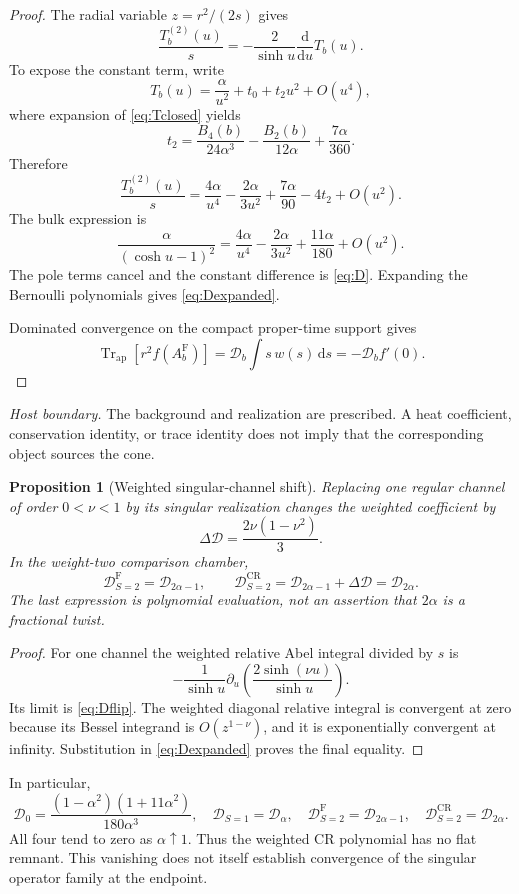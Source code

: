 \documentclass[11pt,a4paper]{article}
\newcommand{\dd}{\mathrm d}
\newcommand{\Fr}{\mathrm F}
\newcommand{\CR}{\mathrm{CR}}
\newcommand{\ApTr}{\operatorname{Tr}_{\mathrm{ap}}}
\newcommand{\Dcal}{\mathcal D}
\theoremstyle{plain}
\newtheorem{proposition}[theorem]{Proposition}
\theoremstyle{definition}
\theoremstyle{remark}
\numberwithin{equation}{section}
\newcommand{\nonsource}{%
  \par\smallskip\noindent
  \emph{Host boundary.}
  The background and realization are prescribed.
  A heat coefficient, conservation identity, or trace identity does
  not imply that the corresponding object sources the cone.%
}
\begin{document}
\begin{proof}
The radial variable \(z=r^2/(2s)\) gives
\[
 \frac{T_b^{(2)}(u)}{s}
 =-\frac{2}{\sinh u}\frac{\dd}{\dd u}T_b(u).
\]
To expose the constant term, write
\[
 T_b(u)=\frac{\alpha}{u^2}+t_0+t_2u^2+O(u^4),
\]
where expansion of \eqref{eq:Tclosed} yields
\[
 t_2=\frac{B_4(b)}{24\alpha^3}
     -\frac{B_2(b)}{12\alpha}
     +\frac{7\alpha}{360}.
\]
Therefore
\[
 \frac{T_b^{(2)}(u)}s
 =\frac{4\alpha}{u^4}-\frac{2\alpha}{3u^2}
   +\frac{7\alpha}{90}-4t_2+O(u^2).
\]
The bulk expression is
\[
 \frac{\alpha}{(\cosh u-1)^2}
 =\frac{4\alpha}{u^4}-\frac{2\alpha}{3u^2}
   +\frac{11\alpha}{180}+O(u^2).
\]
The pole terms cancel and the constant difference is
\eqref{eq:D}. Expanding the Bernoulli polynomials gives
\eqref{eq:Dexpanded}.

Dominated convergence on the compact proper-time support gives
\[
 \ApTr[r^2f(A_b^\Fr)]
 =\Dcal_b\int s\,w(s)\,\dd s=-\Dcal_b f'(0).
\]
\end{proof}
\nonsource

\begin{proposition}[Weighted singular-channel shift]
\label{prop:Dflip}
Replacing one regular channel of order \(0<\nu<1\) by its
singular realization changes the weighted coefficient by
\begin{equation}
 \Delta\Dcal=\frac{2\nu(1-\nu^2)}3.
 \label{eq:Dflip}
\end{equation}
In the weight-two comparison chamber,
\[
 \Dcal_{S=2}^\Fr=\Dcal_{2\alpha-1},
 \qquad
 \Dcal_{S=2}^\CR
 =\Dcal_{2\alpha-1}+\Delta\Dcal
 =\Dcal_{2\alpha}.
\]
The last expression is polynomial evaluation, not an assertion
that \(2\alpha\) is a fractional twist.
\end{proposition}

\begin{proof}
For one channel the weighted relative Abel integral divided by
\(s\) is
\[
 -\frac1{\sinh u}\partial_u
       \left(\frac{2\sinh(\nu u)}{\sinh u}\right).
\]
Its limit is \eqref{eq:Dflip}. The weighted diagonal relative
integral is convergent at zero because its Bessel integrand is
\(O(z^{1-\nu})\), and it is exponentially convergent at infinity.
Substitution in \eqref{eq:Dexpanded} proves the final equality.
\end{proof}

In particular,
\[
 \Dcal_0
 =\frac{(1-\alpha^2)(1+11\alpha^2)}{180\alpha^3},
 \quad
 \Dcal_{S=1}=\Dcal_\alpha,
 \quad
 \Dcal_{S=2}^\Fr=\Dcal_{2\alpha-1},
 \quad
 \Dcal_{S=2}^\CR=\Dcal_{2\alpha}.
\]
All four tend to zero as \(\alpha\uparrow1\).
Thus the weighted CR polynomial has no flat remnant.
This vanishing does not itself establish convergence of the
singular operator family at the endpoint.
\end{document}
